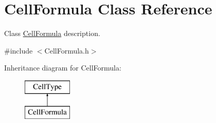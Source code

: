 \hypertarget{class_cell_formula}{}\section{Cell\+Formula Class Reference}
\label{class_cell_formula}


Class \hyperlink{class_cell_formula}{Cell\+Formula} description.  




{\ttfamily \#include $<$Cell\+Formula.\+h$>$}

Inheritance diagram for Cell\+Formula\+:\begin{figure}[H]
\begin{center}
\leavevmode
\includegraphics[height=2.000000cm]{class_cell_formula}
\end{center}
\end{figure}
